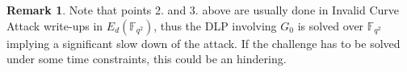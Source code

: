 \documentclass[10pt]{article}
\theoremstyle{definition}
\newtheorem{remark}{Remark}
\newcommand{\F}{\mathbb{F}}
\begin{document}
\begin{remark}
Note that points 2. and 3. above are usually done in Invalid Curve Attack write-ups in $E_d(\F_{q^2})$, thus the DLP involving $G_0$ is solved over $\F_{q^2}$ implying a significant slow down of the attack.
If the challenge has to be solved under some time constraints, this could be an hindering.
\end{remark}




\end{document}
